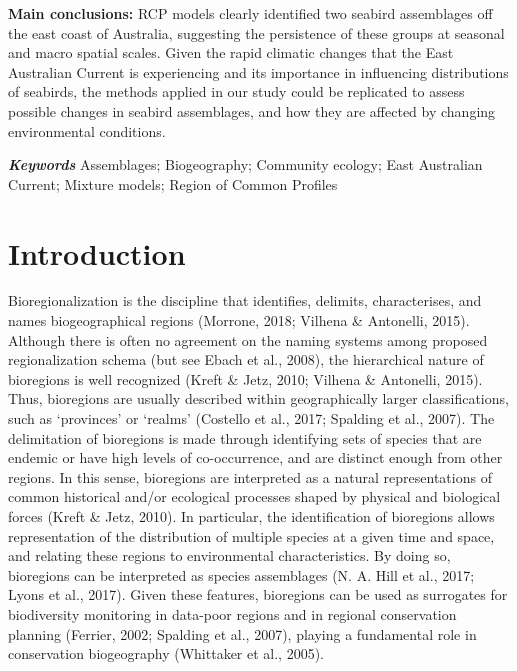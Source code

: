 \documentclass{article}
\begin{document}
\textbf{Main conclusions:} RCP models clearly identified two seabird assemblages off the east coast of Australia, suggesting the persistence of these groups at seasonal and macro spatial scales. Given the rapid climatic changes that the East Australian Current is experiencing and its importance in influencing distributions of seabirds, the methods applied in our study could be replicated to assess possible changes in seabird assemblages, and how they are affected by changing environmental conditions.

\textbf{\emph{Keywords}} Assemblages; Biogeography; Community ecology; East Australian Current; Mixture models; Region of Common Profiles

\newpage

\hypertarget{introduction}{%
\section{Introduction}\label{introduction}}

Bioregionalization is the discipline that identifies, delimits, characterises, and names biogeographical regions (Morrone, 2018; Vilhena \& Antonelli, 2015). Although there is often no agreement on the naming systems among proposed regionalization schema (but see Ebach et al., 2008), the hierarchical nature of bioregions is well recognized (Kreft \& Jetz, 2010; Vilhena \& Antonelli, 2015). Thus, bioregions are usually described within geographically larger classifications, such as `provinces' or `realms' (Costello et al., 2017; Spalding et al., 2007). The delimitation of bioregions is made through identifying sets of species that are endemic or have high levels of co-occurrence, and are distinct enough from other regions. In this sense, bioregions are interpreted as a natural representations of common historical and/or ecological processes shaped by physical and biological forces (Kreft \& Jetz, 2010). In particular, the identification of bioregions allows representation of the distribution of multiple species at a given time and space, and relating these regions to environmental characteristics. By doing so, bioregions can be interpreted as species assemblages (N. A. Hill et al., 2017; Lyons et al., 2017). Given these features, bioregions can be used as surrogates for biodiversity monitoring in data-poor regions and in regional conservation planning (Ferrier, 2002; Spalding et al., 2007), playing a fundamental role in conservation biogeography (Whittaker et al., 2005).
\end{document}
